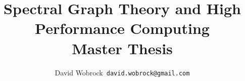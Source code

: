 \documentclass[]{report}
\title{Spectral Graph Theory and High Performance Computing \\ Master Thesis}
\author{David Wobrock\ \texttt{david.wobrock@gmail.com}}
\begin{document}
\begin{titlepage}
 \maketitle
\end{titlepage}

\tableofcontents
\newpage





\clearpage
\printbibliography
\end{document}
